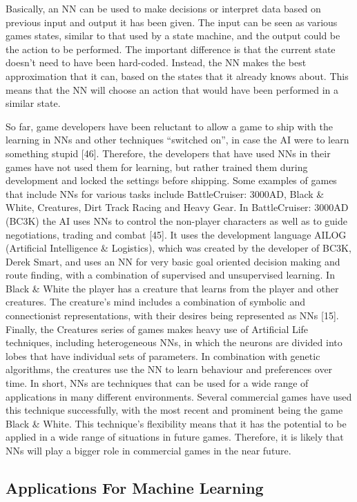 \documentclass[a4paper,oneside]{report}
\begin{document}
Basically, an NN can be used to make decisions or interpret data based on previous input and output it has been given. The input can be seen as various games states, similar to that used by a state machine, and the output could be the action to be performed. The important difference is that the current state doesn’t need to have been hard-coded. Instead, the NN makes the best approximation that it can, based on the states that it already knows about. This means that the NN will choose an action that would have been performed in a similar state.

So far, game developers have been reluctant to allow a game to ship with the learning in NNs and other techniques “switched on”, in case the AI were to learn something stupid [46]. Therefore, the developers that have used NNs in their games have not used them for learning, but rather trained them during development and locked the settings before shipping. Some examples of games that include NNs for various tasks include BattleCruiser: 3000AD, Black \& White, Creatures, Dirt Track Racing and Heavy Gear.
In BattleCruiser: 3000AD (BC3K) the AI uses NNs to control the non-player characters as well as to guide negotiations, trading and combat [45]. It uses the development language AILOG (Artificial Intelligence \& Logistics), which was created by the developer of BC3K, Derek Smart, and uses an NN for very basic goal oriented decision making and route finding, with a combination of supervised and unsupervised learning. In Black \& White the player has a creature that learns from the player and other creatures. The creature’s mind includes a combination of symbolic and connectionist representations, with their desires being represented as NNs [15]. Finally, the Creatures series of games makes heavy use of Artificial Life techniques, including heterogeneous NNs, in which the neurons are divided into lobes that have individual sets of parameters. In combination with genetic algorithms, the creatures use the NN to learn behaviour and preferences over time.
In short, NNs are techniques that can be used for a wide range of applications in many different environments. Several commercial games have used this technique successfully, with the most recent and prominent being the game Black \& White. This technique’s flexibility means that it has the potential to be applied in a wide range of situations in future games. Therefore, it is likely that NNs will play a bigger role in commercial games in the near future.

\subsection{Applications For Machine Learning}
\end{document}
